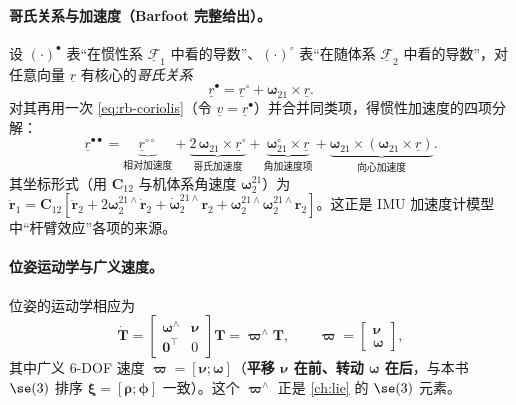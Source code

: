 \paragraph{哥氏关系与加速度（Barfoot 完整给出）。}设 $(\cdot)^{\bullet}$ 表“在惯性系 $\underline{\mathcal{F}}_1$ 中看的导数”、$(\cdot)^{\circ}$ 表“在随体系 $\underline{\mathcal{F}}_2$ 中看的导数”，对任意向量 $\underline{r}$ 有核心的\emph{哥氏关系}
\begin{equation}
  \underline{r}^{\bullet}=\underline{r}^{\circ}+\boldsymbol{\omega}_{21}\times\underline{r}.
  \label{eq:rb-coriolis}
\end{equation}
对其再用一次 \cref{eq:rb-coriolis}（令 $\underline{v}=\underline{r}^{\bullet}$）并合并同类项，得惯性加速度的四项分解：
\begin{equation}
  \underline{r}^{\bullet\bullet}=\underbrace{\underline{r}^{\circ\circ}}_{\text{相对加速度}}
  +\underbrace{2\,\boldsymbol{\omega}_{21}\times\underline{r}^{\circ}}_{\text{哥氏加速度}}
  +\underbrace{\boldsymbol{\omega}_{21}^{\circ}\times\underline{r}}_{\text{角加速度项}}
  +\underbrace{\boldsymbol{\omega}_{21}\times(\boldsymbol{\omega}_{21}\times\underline{r})}_{\text{向心加速度}}.
  \label{eq:rb-coriolis-acc}
\end{equation}
其坐标形式（用 $\mathbf{C}_{12}$ 与机体系角速度 $\boldsymbol{\omega}_2^{21}$）为 $\ddot{\mathbf{r}}_1=\mathbf{C}_{12}[\ddot{\mathbf{r}}_2+2\boldsymbol{\omega}_2^{21\wedge}\dot{\mathbf{r}}_2+\dot{\boldsymbol{\omega}}_2^{21\wedge}\mathbf{r}_2+\boldsymbol{\omega}_2^{21\wedge}\boldsymbol{\omega}_2^{21\wedge}\mathbf{r}_2]$\cite{barfoot2024state}。这正是 IMU 加速度计模型中“杆臂效应”各项的来源。

\paragraph{位姿运动学与广义速度。}位姿的运动学相应为
\begin{equation}
  \dot{\mathbf{T}}=\begin{bmatrix}\boldsymbol{\omega}^\wedge&\boldsymbol{\nu}\\\mathbf{0}^\top&0\end{bmatrix}\mathbf{T}=\boldsymbol{\varpi}^\wedge\mathbf{T},\qquad
  \boldsymbol{\varpi}=\begin{bmatrix}\boldsymbol{\nu}\\\boldsymbol{\omega}\end{bmatrix},
  \label{eq:rb-se3-kin}
\end{equation}
其中广义 $6$-DOF 速度 $\boldsymbol{\varpi}=[\boldsymbol{\nu};\boldsymbol{\omega}]$（\textbf{平移 $\boldsymbol{\nu}$ 在前、转动 $\boldsymbol{\omega}$ 在后}，与本书 $\se(3)$ 排序 $\boldsymbol{\xi}=[\boldsymbol{\rho};\boldsymbol{\phi}]$ 一致）。这个 $\boldsymbol{\varpi}^\wedge$ 正是 \cref{ch:lie} 的 $\se(3)$ 元素\cite{barfoot2024state}。


